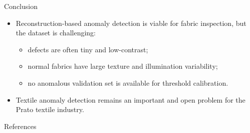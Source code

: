 \documentclass{beamer}
\begin{document}
\begin{frame}{Conclusion}
    \begin{itemize}
        \item Reconstruction-based anomaly detection is viable for fabric inspection, but the dataset is challenging:
        \begin{itemize}
            \item defects are often tiny and low-contrast;
            \item normal fabrics have large texture and illumination variability;
            \item no anomalous validation set is available for threshold calibration.
        \end{itemize}
        \item Textile anomaly detection remains an important and open problem for the Prato textile industry.
    \end{itemize}
\end{frame}

\begin{frame}{References}
    \printbibliography
\end{frame}
\end{document}
